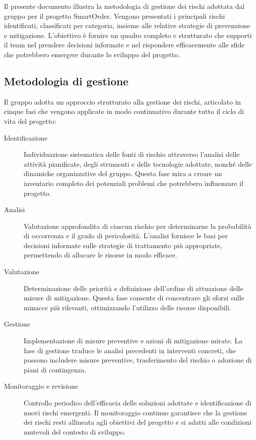 \documentclass[a4paper, 11pt, oneside]{scrartcl} %
\begin{document}
Il presente documento illustra la metodologia di gestione dei rischi adottata dal gruppo per il progetto SmartOrder. Vengono presentati i principali rischi identificati, classificati per categoria, insieme alle relative strategie di prevenzione e mitigazione. L'obiettivo è fornire un quadro completo e strutturato che supporti il team nel prendere decisioni informate e nel rispondere efficacemente alle sfide che potrebbero emergere durante lo sviluppo del progetto.

\subsection{Metodologia di gestione}

Il gruppo adotta un approccio strutturato alla gestione dei rischi, articolato in cinque fasi che vengono applicate in modo continuativo durante tutto il ciclo di vita del progetto:

\begin{description}
    \item[Identificazione] Individuazione sistematica delle fonti di rischio attraverso l'analisi delle attività pianificate, degli strumenti e delle tecnologie adottate, nonché delle dinamiche organizzative del gruppo. Questa fase mira a creare un inventario completo dei potenziali problemi che potrebbero influenzare il progetto.
    
    \item[Analisi] Valutazione approfondita di ciascun rischio per determinarne la probabilità di occorrenza e il grado di pericolosità. L'analisi fornisce le basi per decisioni informate sulle strategie di trattamento più appropriate, permettendo di allocare le risorse in modo efficace.
    
    \item[Valutazione] Determinazione delle priorità e definizione dell'ordine di attuazione delle misure di mitigazione. Questa fase consente di concentrare gli sforzi sulle minacce più rilevanti, ottimizzando l'utilizzo delle risorse disponibili.
    
    \item[Gestione] Implementazione di misure preventive e azioni di mitigazione mirate. La fase di gestione traduce le analisi precedenti in interventi concreti, che possono includere misure preventive, trasferimento del rischio o adozione di piani di contingenza.
    
    \item[Monitoraggio e revisione] Controllo periodico dell'efficacia delle soluzioni adottate e identificazione di nuovi rischi emergenti. Il monitoraggio continuo garantisce che la gestione dei rischi resti allineata agli obiettivi del progetto e si adatti alle condizioni mutevoli del contesto di sviluppo.
\end{description}
\end{document}
